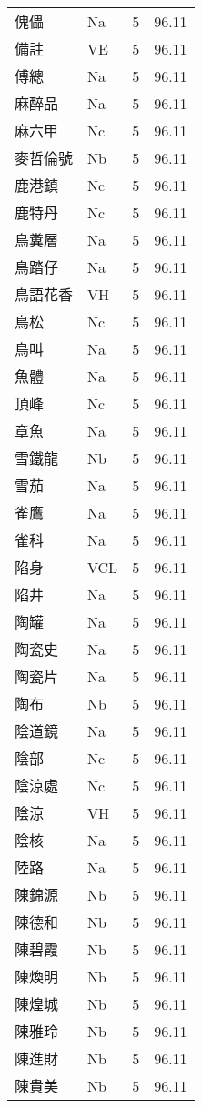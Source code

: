 \documentclass[twocolumn]{book}
\begin{document}
\begin{supertabular}{llrr}
傀儡 & Na & 5 &  96.11\\
備註 & VE & 5 &  96.11\\
傅總 & Na & 5 &  96.11\\
麻醉品 & Na & 5 &  96.11\\
麻六甲 & Nc & 5 &  96.11\\
麥哲倫號 & Nb & 5 &  96.11\\
鹿港鎮 & Nc & 5 &  96.11\\
鹿特丹 & Nc & 5 &  96.11\\
鳥糞層 & Na & 5 &  96.11\\
鳥踏仔 & Na & 5 &  96.11\\
鳥語花香 & VH & 5 &  96.11\\
鳥松 & Nc & 5 &  96.11\\
鳥叫 & Na & 5 &  96.11\\
魚體 & Na & 5 &  96.11\\
頂峰 & Nc & 5 &  96.11\\
章魚 & Na & 5 &  96.11\\
雪鐵龍 & Nb & 5 &  96.11\\
雪茄 & Na & 5 &  96.11\\
雀鷹 & Na & 5 &  96.11\\
雀科 & Na & 5 &  96.11\\
陷身 & VCL & 5 &  96.11\\
陷井 & Na & 5 &  96.11\\
陶罐 & Na & 5 &  96.11\\
陶瓷史 & Na & 5 &  96.11\\
陶瓷片 & Na & 5 &  96.11\\
陶布 & Nb & 5 &  96.11\\
陰道鏡 & Na & 5 &  96.11\\
陰部 & Nc & 5 &  96.11\\
陰涼處 & Nc & 5 &  96.11\\
陰涼 & VH & 5 &  96.11\\
陰核 & Na & 5 &  96.11\\
陸路 & Na & 5 &  96.11\\
陳錦源 & Nb & 5 &  96.11\\
陳德和 & Nb & 5 &  96.11\\
陳碧霞 & Nb & 5 &  96.11\\
陳煥明 & Nb & 5 &  96.11\\
陳煌城 & Nb & 5 &  96.11\\
陳雅玲 & Nb & 5 &  96.11\\
陳進財 & Nb & 5 &  96.11\\
陳貴美 & Nb & 5 &  96.11\\

\end{supertabular}
\end{document}
